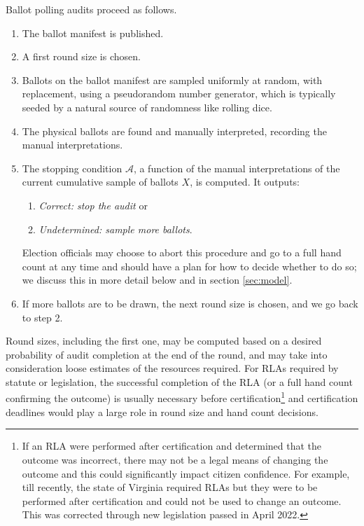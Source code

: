 Ballot polling audits proceed as follows. 
\begin{enumerate}
\item The ballot manifest is published. 
\item A first round size \cite{usenix_minerva} is chosen. %
\item Ballots on the ballot manifest are sampled uniformly at random, with replacement, using a pseudorandom number generator, which is typically seeded by a natural source of randomness like rolling dice.
\item The physical ballots are found and manually interpreted, recording the manual interpretations. 
\item The stopping condition $\mathcal{A}$, a function of the manual interpretations of the current cumulative sample of ballots $X$, is computed. It outputs: 
\begin{enumerate}
\item \emph{Correct: stop the audit} or 
\item \emph{Undetermined: sample more ballots}. 
\end{enumerate}
Election officials may choose to abort this procedure and go to a full hand count at any time and should have a plan for how to decide whether to do so; we discuss this in more detail below and in section \ref{sec:model}.     
\item If more ballots are to be drawn, the next round size is chosen, and we go back to step 2. 
\end{enumerate} 

Round sizes, including the first one, may be computed based on a desired probability of audit completion at the end of the round, and may take into consideration loose estimates of the resources required. For RLAs required by statute or legislation, the successful completion of the RLA (or a full hand count confirming the outcome) is usually necessary before certification\footnote{If an RLA were performed after certification and determined that the outcome was incorrect, there may not be a legal means of changing the outcome and this could significantly impact citizen confidence. For example, till recently, the state of Virginia required RLAs but they were to be performed after certification and could not be used to change an outcome. This was corrected through new legislation passed in April 2022.} and certification deadlines would play a large role in round size and hand count decisions. 

